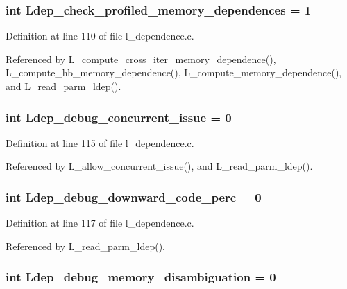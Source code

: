 \subsubsection{\setlength{\rightskip}{0pt plus 5cm}int \bf{Ldep\_\-check\_\-profiled\_\-memory\_\-dependences} = 1}\label{l__dependence_8c_630979af3763c48fc0ead7e44dcc19f6}




Definition at line 110 of file l\_\-dependence.c.

Referenced by L\_\-compute\_\-cross\_\-iter\_\-memory\_\-dependence(), L\_\-compute\_\-hb\_\-memory\_\-dependence(), L\_\-compute\_\-memory\_\-dependence(), and L\_\-read\_\-parm\_\-ldep().
\subsubsection{\setlength{\rightskip}{0pt plus 5cm}int \bf{Ldep\_\-debug\_\-concurrent\_\-issue} = 0}\label{l__dependence_8c_cb02d0de546d9171fd33c28f83a4a22e}




Definition at line 115 of file l\_\-dependence.c.

Referenced by L\_\-allow\_\-concurrent\_\-issue(), and L\_\-read\_\-parm\_\-ldep().
\subsubsection{\setlength{\rightskip}{0pt plus 5cm}int \bf{Ldep\_\-debug\_\-downward\_\-code\_\-perc} = 0}\label{l__dependence_8c_32acee3fd00b56e2d0aecc59d202c40c}




Definition at line 117 of file l\_\-dependence.c.

Referenced by L\_\-read\_\-parm\_\-ldep().
\subsubsection{\setlength{\rightskip}{0pt plus 5cm}int \bf{Ldep\_\-debug\_\-memory\_\-disambiguation} = 0}\label{l__dependence_8c_6e0424048d23e9f266a7b2e9c728a3b9}




